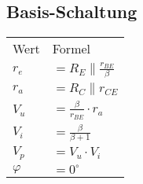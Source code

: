 \subsection{Basis-Schaltung}
    \begin{minipage}{0.3\columnwidth}
        \begin{table}[H]
            \begin{tabularx}{\columnwidth}{l l}
                Wert  & Formel \\
                $r_e$ & $=R_E\parallel\frac{r_{BE}}{\beta}$ \\
                $r_a$ & $=R_C\parallel r_{CE} $ \\
                $V_u$ & $=\frac{\beta}{r_{BE}}\cdot r_a$ \\
                $V_i$ & $=\frac{\beta}{\beta +1}$ \\
                $V_p$ & $=V_u\cdot V_i$\\
                $\varphi$ & $=0^{\circ}$ \\ %
            \end{tabularx}
        \end{table}
    \end{minipage}
    \begin{minipage}{0.7\columnwidth}
        
    \end{minipage}
